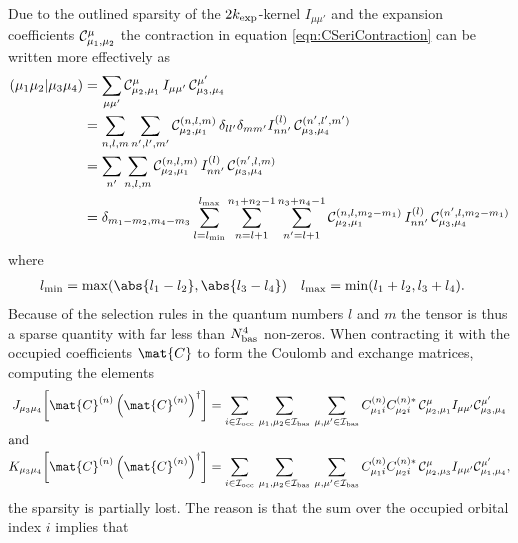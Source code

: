 Due to the outlined sparsity of the $2k_\text{exp}$-kernel $I_{\mu\mu'}$
and the expansion coefficients $\mathcal{C}^\mu_{\mu_1,\mu_2}$
the contraction in equation \eqref{eqn:CSeriContraction} can be written
more effectively as
\begin{equation}
	\begin{aligned}
	\left( \mu_1\mu_2 \middle| \mu_3\mu_4 \right)
		&= \sum_{\mu\mu'} \mathcal{C}^\mu_{\mu_2,\mu_1}
		\, I_{\mu\mu'} \, \mathcal{C}^{\mu'}_{\mu_3,\mu_4} \\
		&= \sum_{n,l,m} \sum_{n',l',m'}
			\mathcal{C}^{(n,l,m)}_{\mu_2,\mu_1}
			\, \delta_{ll'} \delta_{mm'} I^{(l)}_{nn'} \,
			\mathcal{C}^{(n',l',m')}_{\mu_3,\mu_4} \\
		&= \sum_{n'} \sum_{n,l,m}
			\mathcal{C}^{(n,l,m)}_{\mu_2,\mu_1}
			\, I^{(l)}_{nn'} \,
			\mathcal{C}^{(n',l,m)}_{\mu_3,\mu_4} \\
		&= \delta_{m_1 - m_2, m_4 - m_3}
		\sum_{l=l_\text{min}}^{l_\text{max}} \sum_{n=l+1}^{n_1+n_2-1} \sum_{n'=l+1}^{n_3+n_4-1}
			\mathcal{C}^{(n,l,m_2-m_1)}_{\mu_2,\mu_1}
			\, I^{(l)}_{nn'} \,
			\mathcal{C}^{(n',l,m_2-m_1)}_{\mu_3,\mu_4}
	\end{aligned}
	\label{eqn:CSeriContractionEffective}
\end{equation}
where
\begin{align}
	\lmin &= \max(\abs{l_1-l_2},\abs{l_3-l_4}) &
	\lmax &= \min(l_1+l_2, l_3+l_4).
	\label{eqn:CSminmax}
\end{align}
Because of the selection rules in the quantum numbers $l$ and $m$
the \ERI tensor is thus a sparse quantity
with far less than $N_\text{bas}^4$ non-zeros.
When contracting it with the occupied coefficients $\mat{C}$
to form the Coulomb and exchange matrices, \ie computing the elements
\begin{align}
	\label{eqn:CScoulomb}
	J_{\mu_3\mu_4}\!\left[\mat{C}^{(n)}\left(\mat{C}^{(n)}\right)^\dagger\right]
	&= \sum_{i\in\Iocc} \, \sum_{\mu_1,\mu_2 \in\Ibas} \, \sum_{\mu,\mu'\in\Ibas}
		C^{(n)}_{\mu_1 i} C^{(n)\ast}_{\mu_2 i} \,
		\csC^{\mu}_{\mu_2,\mu_1}
		I_{\mu\mu'} \csC^{\mu'}_{\mu_3,\mu_4} \\
\intertext{and}
	\label{eqn:CSexchange}
	K_{\mu_3\mu_4}\!\left[\mat{C}^{(n)}\left(\mat{C}^{(n)}\right)^\dagger\right]
	&= \sum_{i\in\Iocc} \, \sum_{\mu_1,\mu_2 \in\Ibas} \, \sum_{\mu,\mu'\in\Ibas}
		C^{(n)}_{\mu_1 i} C^{(n)\ast}_{\mu_2 i} \,
		\csC^{\mu}_{\mu_2,\mu_3}
		I_{\mu\mu'} \csC^{\mu'}_{\mu_1,\mu_4},
\end{align}
the sparsity is partially lost.
The reason is that the sum over the occupied orbital index $i$ implies that
